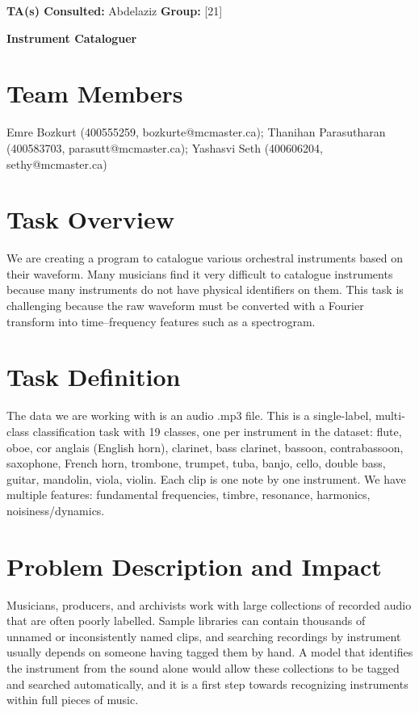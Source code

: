 \documentclass[12pt]{article}
\begin{document}
\noindent \textbf{TA(s) Consulted:} Abdelaziz \hfill \textbf{Group:} [21]

\begin{center}
{\Large \textbf{Instrument Cataloguer}}
\end{center}
\vspace{-1.5em}
\section{Team Members}
{\raggedright\noindent Emre Bozkurt (400555259, bozkurte@mcmaster.ca); Thanihan Parasutharan (400583703, parasutt@mcmaster.ca); Yashasvi Seth (400606204, sethy@mcmaster.ca)\par}
\section{Task Overview}
We are creating a program to catalogue various orchestral instruments based on their waveform. 
Many musicians find it very difficult to catalogue instruments because many instruments do not have physical identifiers on them.
This task is challenging because the raw waveform must be converted with a Fourier transform into time--frequency features such as a spectrogram.
\section{Task Definition}
The data we are working with is an audio .mp3 file. This is a single-label, multi-class classification task with 19 classes, one per instrument in the dataset: flute, oboe, cor anglais (English horn), clarinet, bass clarinet, bassoon, contrabassoon, saxophone, French horn, trombone, trumpet, tuba, banjo, cello, double bass, guitar, mandolin, viola, violin. Each clip is one note by one instrument. We have multiple features: fundamental frequencies, timbre, resonance, harmonics, noisiness/dynamics.
\section{Problem Description and Impact}
Musicians, producers, and archivists work with large collections of recorded audio that are often poorly
labelled. Sample libraries can contain thousands of unnamed or inconsistently named clips, and searching
recordings by instrument usually depends on someone having tagged them by hand. A model that identifies
the instrument from the sound alone would allow these collections to be tagged and searched
automatically, and it is a first step towards recognizing instruments within full pieces of music.
\end{document}
